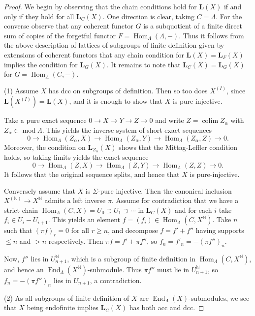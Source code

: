 \documentclass[10pt,a4paper]{amsart}
\newcommand{\End}{\operatorname{End}}
\newcommand{\Hom}{\operatorname{Hom}}
\def\La{\Lambda}
\def\bbN{\mathbb N}
\def\bfL{\mathbf L}
\newcommand{\colim}{\operatorname*{colim}}
\renewcommand{\mod}{\operatorname{mod}}
\begin{document}
\begin{proof}
  We begin by observing that the chain conditions hold for $\bfL(X)$
  if and only if they hold for all $\bfL_C(X)$. One direction is
  clear, taking $C=\Lambda$. For the converse observe that any
  coherent functor $G$ is a subquotient of a finite direct sum of
  copies of the forgetful functor $F=\Hom_\La(\La,-)$.
  Thus it follows from the above description of lattices of subgroups
  of finite definition given by extensions of coherent functors that any chain
  condition for $\bfL(X)=\bfL_F(X)$ implies the condition for
  $\bfL_G(X)$. It remains to note that  $\bfL_C(X)=\bfL_G(X)$ for $G=\Hom_\La(C,-)$. 

(1) Assume $X$ has dcc on subgroups of definition. Then so too does $X^{(I)}$, since $\bfL(X^{(I)})=\bfL(X)$, and it is enough to show that $X$ is pure-injective.

Take a pure exact sequence $0\to X\to Y\to Z\to 0$ and write $Z=\colim Z_\alpha$ with $Z_\alpha\in\mod\Lambda$. This yields the inverse system of short exact sequences
\[ 0 \to \Hom_\Lambda(Z_\alpha,X) \to \Hom_\Lambda(Z_\alpha,Y) \to \Hom_\Lambda(Z_\alpha,Z) \to 0. \]
Moreover, the condition on $\bfL_{Z_\alpha}(X)$ shows that the Mittag-Leffler condition holds, so taking limits yields the exact sequence
\[ 0 \to \Hom_\Lambda(Z,X) \to \Hom_\Lambda(Z,Y) \to \Hom_\Lambda(Z,Z) \to 0. \]
It follows that the original sequence splits, and hence that $X$ is pure-injective.

Conversely assume that $X$ is $\Sigma$-pure injective. Then the canonical inclusion $X^{(\bbN)}\to X^\bbN$ admits a left inverse $\pi$. Assume for contradiction that we have a strict chain $\Hom_\Lambda(C,X)=U_0\supset U_1\supset\cdots$ in $\bfL_C(X)$ and for each $i$ take $f_i\in U_i-U_{i+1}$. This yields an element $f=(f_i)\in\Hom_\Lambda(C,X^\bbN)$. Take $n$ such that $(\pi f)_r=0$ for all $r\geq n$, and decompose $f=f'+f''$ having supports $\leq n$ and $>n$ respectively. Then $\pi f=f'+\pi f''$, so $f_n=f'_n=-(\pi f'')_n$.

Now, $f''$ lies in $U_{n+1}^\bbN$, which is a subgroup of finite definition in $\Hom_\Lambda(C,X^\bbN)$, and hence an $\End_\Lambda(X^\bbN)$-submodule. Thus $\pi f''$ must lie in $U_{n+1}^\bbN$, so $f_n=-(\pi f'')_n$ lies in $U_{n+1}$, a contradiction.
\medskip

(2) As all subgroups of finite definition of $X$ are $\End_\Lambda(X)$-submodules, we see that $X$ being endofinite implies $\bfL_C(X)$ has both acc and dcc.


\end{proof}
\end{document}
